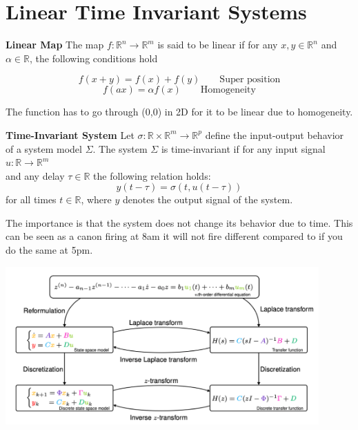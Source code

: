 \section{Linear Time Invariant Systems}

\textbf{Linear Map} \newline
The map $f: \mathbb{R}^n \to  \mathbb{R}^m$ is said to be linear if for any $x,y \in \mathbb{R}^n$ and
$\alpha \in \mathbb{R}$, the following conditions hold

$$f(x+y) = f(x) + f(y)  \qquad \text{Super position}$$
$$f(ax) = \alpha f(x) \qquad \text{Homogeneity}$$

The function has to go through (0,0) in 2D for it to be linear due to homogeneity.


\textbf{Time-Invariant System} \newline
Let $\sigma: \mathbb{R}\times \mathbb{R}^m \to \mathbb{R}^p$ define the input-output behavior of a system model $\Sigma$.
The system $\Sigma$ is time-invariant if for any input signal $u:\mathbb{R}\to \mathbb{R}^m$\\
and any delay $\tau \in \mathbb{R}$ the following relation holds:
$$ y(t-\tau)= \sigma(t,u(t-\tau))$$
for all times $t\in \mathbb{R}$, where $y$ denotes the output signal of the system.

The importance is that the system does not change its behavior due to time.
This can be seen as a canon firing at 8am it will not fire different
compared to if you do the same at 5pm.
\begin{center}
\includegraphics[width=0.9\textwidth]{Images/Models.png}
\end{center}
